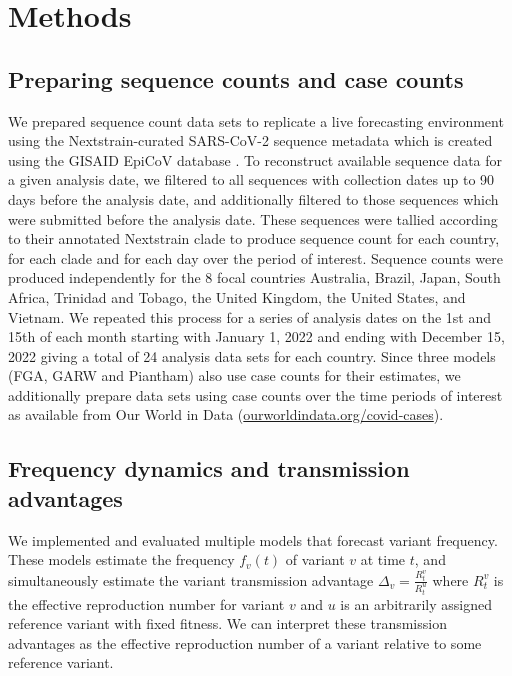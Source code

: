 \documentclass[11pt,oneside,letterpaper]{article}
\begin{document}
\section*{Methods}

\subsection*{Preparing sequence counts and case counts}

We prepared sequence count data sets to replicate a live forecasting environment using the Nextstrain-curated SARS-CoV-2 sequence metadata \cite{hadfield2018nextstrain} which is created using the GISAID EpiCoV database \cite{khare2021gisaid}.
To reconstruct available sequence data for a given analysis date, we filtered to all sequences with collection dates up to 90 days before the analysis date, and additionally filtered to those sequences which were submitted before the analysis date.
These sequences were tallied according to their annotated Nextstrain clade to produce sequence count for each country, for each clade and for each day over the period of interest.
Sequence counts were produced independently for the 8 focal countries Australia, Brazil, Japan, South Africa, Trinidad and Tobago, the United Kingdom, the United States, and Vietnam.
We repeated this process for a series of analysis dates on the 1st and 15th of each month starting with January 1, 2022 and ending with December 15, 2022 giving a total of 24 analysis data sets for each country.
Since three models (FGA, GARW and Piantham) also use case counts for their estimates, we additionally prepare data sets using case counts over the time periods of interest as available from Our World in Data (\href{https://ourworldindata.org/covid-cases}{ourworldindata.org/covid-cases}).

\subsection*{Frequency dynamics and transmission advantages}

We implemented and evaluated multiple models that forecast variant frequency.
These models estimate the frequency $f_{v}(t)$ of variant $v$ at time $t$, and simultaneously estimate the variant transmission advantage $\Delta_{v} = \frac{R_{t}^{v}}{R_{t}^{u}}$ where $R_{t}^{v}$ is the effective reproduction number for variant $v$ and $u$ is an arbitrarily assigned reference variant with fixed fitness.
We can interpret these transmission advantages as the effective reproduction number of a variant relative to some reference variant.
\end{document}
